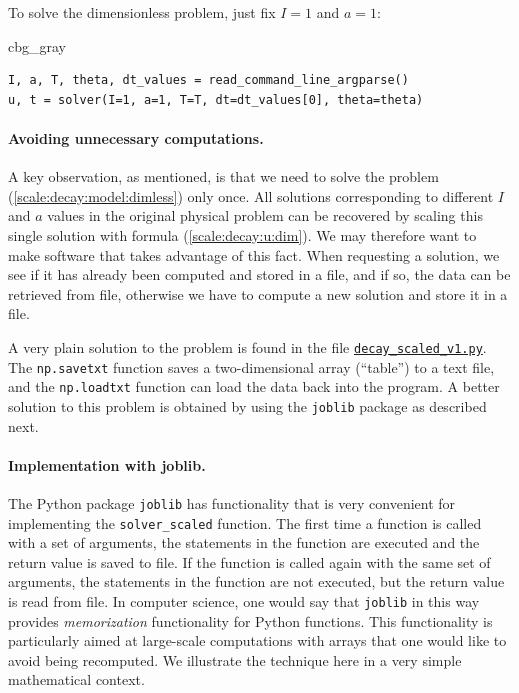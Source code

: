 \documentclass[graybox,envcountchap,sectrefs,final]{svmonodo}
\newenvironment{_cod_tight}[1]{
   \def\FrameCommand{\colorbox{#1}}
   \FrameRule0.6pt\MakeFramed {\FrameRestore}\vskip3mm}
   {\vskip0mm\endMakeFramed}
\newenvironment{cod}[1]{
\bgroup\rmfamily
\fboxsep=0mm\relax
\begin{_cod_tight}{#1}
\list{}{\parsep=-2mm\parskip=0mm\topsep=0pt\leftmargin=2mm
\rightmargin=2\leftmargin\leftmargin=4pt\relax}
\item\relax}
{\endlist\end{_cod_tight}\egroup}
\begin{document}
To solve the dimensionless problem, just fix $I=1$ and $a=1$:

\begin{cod}{cbg_gray}\begin{Verbatim}[numbers=none,fontsize=\fontsize{9pt}{9pt},baselinestretch=0.95,xleftmargin=2mm]
I, a, T, theta, dt_values = read_command_line_argparse()
u, t = solver(I=1, a=1, T=T, dt=dt_values[0], theta=theta)
\end{Verbatim}
\end{cod}
\noindent


\paragraph{Avoiding unnecessary computations.}
A key observation, as mentioned, is that we need to solve the problem
(\ref{scale:decay:model:dimless}) only once. All solutions
corresponding to different $I$ and $a$ values in the original physical
problem can be recovered by scaling this single solution with formula
(\ref{scale:decay:u:dim}).  We may therefore want to make software that
takes advantage of this fact. When requesting a solution, we see if it
has already been computed and stored in a file, and if so, the data
can be retrieved from file, otherwise we have to compute a new
solution and store it in a file.

A very plain solution to the problem is found in the file
\href{{http://tinyurl.com/o8pb3yy/decay_scaled_v1.py}}{\nolinkurl{decay_scaled_v1.py}}.
The \texttt{np.savetxt} function saves a two-dimensional array (``table'') to
a text file, and the \texttt{np.loadtxt} function can load the data back
into the program. A better solution to this problem is obtained
by using the \texttt{joblib} package as described next.


\paragraph{Implementation with joblib.}
The Python package \texttt{joblib} has functionality that is very convenient
for implementing the \Verb!solver_scaled! function. The first time a
function is called with a set of arguments, the statements in the
function are executed and the return value is saved to file. If the
function is called again with the same set of arguments, the
statements in the function are not executed, but the return value is
read from file. In computer science, one would say that \texttt{joblib} in
this way provides \emph{memorization} functionality for Python functions.
This functionality is particularly aimed at large-scale computations
with arrays that one would like to avoid being recomputed. We
illustrate the technique here in a very simple mathematical context.
\end{document}
